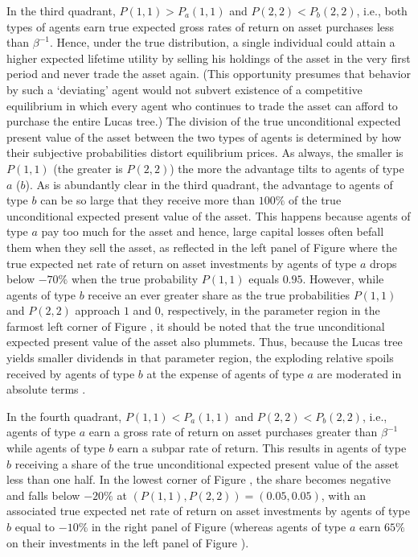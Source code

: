 In the third quadrant, $P(1,1)>P_a(1,1)$ and 
$P(2,2)<P_b(2,2)$, i.e., both types of agents
earn true expected gross rates of return on asset 
purchases less than $\beta^{-1}$. 
Hence, under the true
distribution,  a single individual could attain a
higher expected lifetime utility by selling his  holdings of the asset
in the very first period and never trade the asset again.
(This opportunity presumes  that behavior by  such a `deviating' 
agent would  not subvert  existence of a 
competitive equilibrium in which every 
agent who continues to trade the asset 
can afford to purchase the entire Lucas tree.)
The division of the true unconditional expected 
present value of the asset between the two types
of agents is determined by how their subjective
probabilities distort equilibrium prices.
As always, the smaller is $P(1,1)$ (the greater is
$P(2,2)$) the more the advantage  tilts to agents 
of type $a$ ($b$). As is abundantly clear 
in the third quadrant, the advantage to agents 
of type $b$ can be so large that they receive 
more than $100\%$ of the true unconditional 
expected present value of the asset.
This happens because agents of type $a$ 
pay too much for  the 
asset and hence, large capital losses 
often befall them when they sell the
asset, as reflected in the left panel of
Figure  where the true expected net 
rate of return on asset investments by agents 
of type $a$ drops below $-70\%$ when the true 
probability $P(1,1)$ equals $0.95$. However, 
while agents of type $b$ receive an ever greater 
share as the true probabilities $P(1,1)$ and 
$P(2,2)$ approach $1$ and $0$, respectively,  
in the parameter region in 
the farmost left corner of Figure ,
it should be noted that the true unconditional
expected present value of the asset  also plummets. Thus, because
 the Lucas tree yields
smaller dividends in that parameter region, the exploding 
relative spoils received by agents of type $b$ 
at the expense of agents of type $a$ are moderated
in absolute terms .

In the fourth quadrant, $P(1,1)<P_a(1,1)$ and 
$P(2,2)<P_b(2,2)$, i.e., agents of type $a$ earn 
a gross rate of return on asset purchases greater 
than $\beta^{-1}$ while agents of type $b$ earn a 
subpar rate of return. This results in agents of 
type $b$ receiving a share of the true unconditional 
expected present value of the asset less than one 
half. In the lowest corner of Figure ,
the share becomes negative and falls below 
$-20\%$ at $(P(1,1),P(2,2))=(0.05,0.05)$, with an  
associated true expected net rate of return on asset 
investments by agents of type $b$ equal to $-10\%$ in 
the right panel of Figure  (whereas
agents of type $a$ earn $65\%$ on their
investments in the left panel of Figure ).



